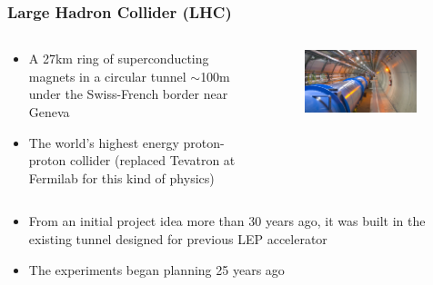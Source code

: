 \begin{frame}
\frametitle{Large Hadron Collider (LHC)}

\begin{columns}[T] %

\begin{column}{.50\textwidth}
\begin{itemize}
\item A 27km ring of superconducting magnets in a circular tunnel $\sim$100m under the Swiss-French border near Geneva
\item The world's highest energy proton-proton collider (replaced Tevatron at Fermilab for this kind of physics)
\end{itemize}
\end{column}%


\begin{column}{.50\textwidth}
\begin{figure}[htbp]
\begin{center}
\includegraphics[width=0.9\textwidth]{images/lhc-tunnel.png}
\end{center}
\end{figure}
\end{column}%

\end{columns}

\begin{itemize}
\item From an initial project idea more than 30 years ago, it was built in the existing tunnel designed for previous LEP accelerator
\item The experiments began planning 25 years ago
\end{itemize}



\end{frame}


